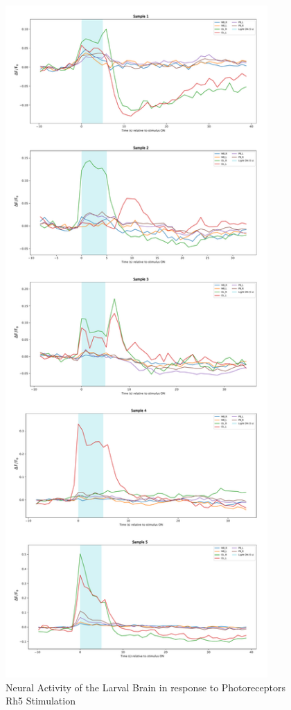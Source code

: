     \begin{figure}
        \centering
        \includegraphics[width=10cm]{Figs/CX/RH5stimulation.pdf}
        \caption[Neural Activity of the Larval Brain in response to Photoreceptors Rh5 Stimulation]{Neural Activity of the Larval Brain in response to Photoreceptors Rh5 Stimulation}
        \label{RH5stimulation}
    \end{figure}


